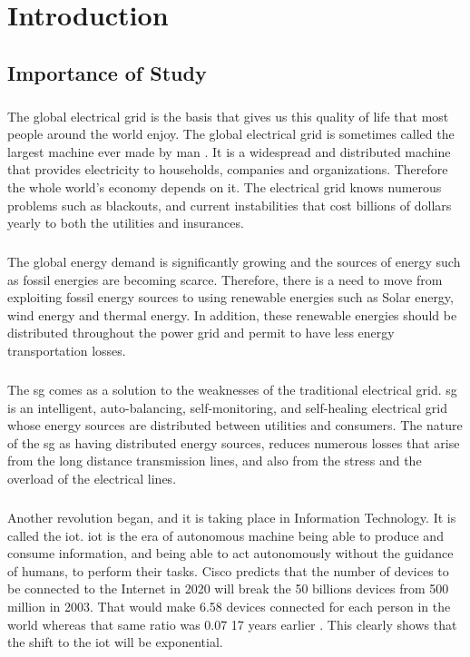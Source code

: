 \documentclass[oneside,12pt,a4paper,final]{book}
\begin{document}
\tableofcontents
\listoffigures
\listoftables
\printglossaries

\mainmatter
\doublespacing
\chapter{Introduction}

\section{Importance of Study}
\paragraph{}
The global electrical grid is the basis that gives us this quality of life that most people around the world enjoy. The global electrical grid is sometimes called the largest machine ever made by man \cite{ref1}. It is a widespread and distributed machine that provides electricity to households, companies and organizations. Therefore the whole world's economy depends on it. The electrical grid knows numerous problems such as blackouts, and current instabilities that cost billions of dollars yearly to both the utilities and insurances.
\paragraph{}
The global energy demand is significantly growing and the sources of energy such as fossil energies are becoming scarce. Therefore, there is a need to move from exploiting fossil energy sources to using renewable energies such as Solar energy, wind energy and thermal energy. In addition, these renewable energies should be distributed throughout the power grid and permit to have less energy transportation losses.
\paragraph{}
The \gls{sg} comes as a solution to the weaknesses of the traditional electrical grid. \gls{sg} is an intelligent, auto-balancing, self-monitoring, and self-healing electrical grid \cite{ref2} whose energy sources are distributed between utilities and consumers. The nature of the \gls{sg} as having distributed energy sources, reduces numerous losses that arise from the long distance transmission lines, and also from the stress and the overload of the electrical lines.
\paragraph{}
Another revolution began, and it is taking place in Information Technology. It is called the \gls{iot}. \gls{iot} is the era of autonomous machine being able to produce and consume information, and being able to act autonomously without the guidance of humans, to perform their tasks. Cisco predicts that the number of devices to be connected to the Internet in 2020 will break the 50 billions devices from 500 million in 2003. That would make 6.58 devices connected for each person in the world whereas that same ratio was 0.07 17 years earlier \cite{ref3}. This clearly shows that the shift to the \gls{iot} will be exponential.
\end{document}
